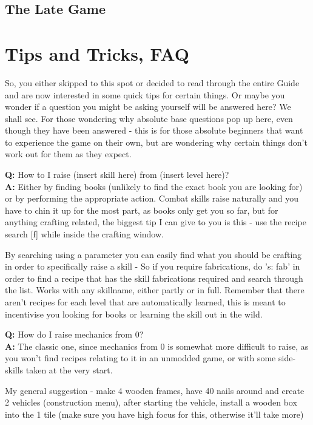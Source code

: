 \documentclass[11pt]{report}
\begin{document}
\section{The Late Game}


\chapter{Tips and Tricks, FAQ}

So, you either skipped to this spot or decided to read through the entire Guide and are now interested in some quick tips for certain things. Or maybe you wonder if a question you might be asking yourself will be answered here? We shall see. For those wondering why absolute base questions pop up here, even though they have been answered - this is for those absolute beginners that want to experience the game on their own, but are wondering why certain things don't work out for them as they expect.

\textbf{Q:} How to I raise (insert skill here) from (insert level here)?\\
\textbf{A:} Either by finding books (unlikely to find the exact book you are looking for) or by performing the appropriate action. Combat skills raise naturally and you have to chin it up for the most part, as books only get you so far, but for anything crafting related, the biggest tip I can give to you is this - use the recipe search [f] while inside the crafting window.

By searching using a parameter you can easily find what you should be crafting in order to specifically raise a skill - So if you require fabrications, do 's: fab' in order to find a recipe that has the skill fabrications required and search through the list. Works with any skillname, either partly or in full. Remember that there aren't recipes for each level that are automatically learned, this is meant to incentivise you looking for books or learning the skill out in the wild.

\textbf{Q:} How do I raise mechanics from 0?\\
\textbf{A:} The classic one, since mechanics from 0 is somewhat more difficult to raise, as you won't find recipes relating to it in an unmodded game, or with some side-skills taken at the very start.

My general suggestion - make 4 wooden frames, have 40 nails around and create 2 vehicles (construction menu), after starting the vehicle, install a wooden box into the 1 tile (make sure you have high focus for this, otherwise it'll take more)
\end{document}
